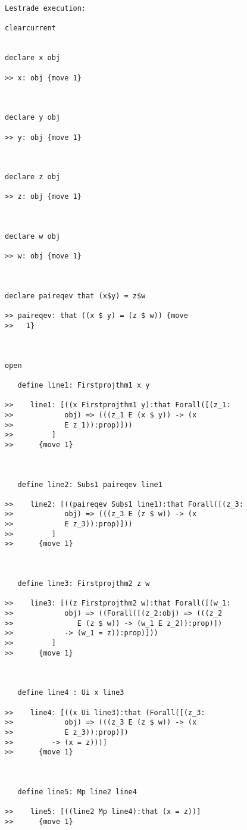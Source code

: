 \documentclass[12pt]{article}
\begin{document}
\begin{verbatim}Lestrade execution:

clearcurrent


declare x obj

>> x: obj {move 1}



declare y obj

>> y: obj {move 1}



declare z obj

>> z: obj {move 1}



declare w obj

>> w: obj {move 1}



declare paireqev that (x$y) = z$w

>> paireqev: that ((x $ y) = (z $ w)) {move
>>   1}



open

   define line1: Firstprojthm1 x y

>>    line1: [((x Firstprojthm1 y):that Forall([(z_1:
>>            obj) => (((z_1 E (x $ y)) -> (x
>>            E z_1)):prop)]))
>>         ]
>>      {move 1}



   define line2: Subs1 paireqev line1

>>    line2: [((paireqev Subs1 line1):that Forall([(z_3:
>>            obj) => (((z_3 E (z $ w)) -> (x
>>            E z_3)):prop)]))
>>         ]
>>      {move 1}



   define line3: Firstprojthm2 z w

>>    line3: [((z Firstprojthm2 w):that Forall([(w_1:
>>            obj) => ((Forall([(z_2:obj) => (((z_2
>>               E (z $ w)) -> (w_1 E z_2)):prop)])
>>            -> (w_1 = z)):prop)]))
>>         ]
>>      {move 1}



   define line4 : Ui x line3

>>    line4: [((x Ui line3):that (Forall([(z_3:
>>            obj) => (((z_3 E (z $ w)) -> (x
>>            E z_3)):prop)])
>>         -> (x = z)))]
>>      {move 1}



   define line5: Mp line2 line4

>>    line5: [((line2 Mp line4):that (x = z))]
>>      {move 1}




\end{verbatim}
\end{document}
